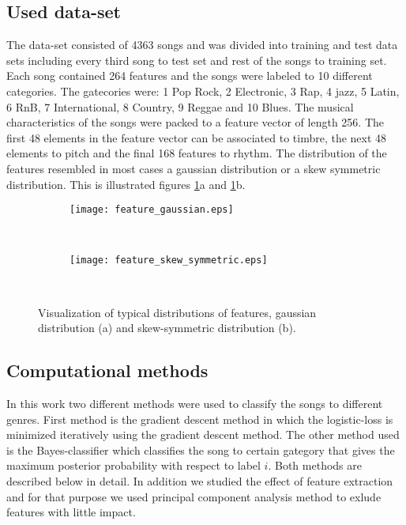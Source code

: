 \documentclass[aps,prb,10pt,twocolumn,groupedaddress]{revtex4-1}
\begin{document}
\subsection{Used data-set}
\label{sec:used_data_set}
The data-set consisted of 4363 songs and was divided into training and test data
sets including every third song to test set and rest of the songs to training
set. Each song contained 264 features and the songs were labeled to 10
different categories. The gatecories were: 1 Pop Rock, 2 Electronic, 3 Rap,
4 jazz, 5 Latin, 6 RnB, 7 International, 8 Country, 9 Reggae and 10 Blues.
The musical characteristics of the songs were packed to a feature
vector of length 256. The first 48 elements in the feature vector can be
associated to timbre, the next 48 elements to pitch and the final 168 features
to rhythm. The distribution of the features resembled in most cases a gaussian
distribution or a skew symmetric distribution. This is illustrated figures
\ref{fig:feature_distribution}a and \ref{fig:feature_distribution}b.
\begin{figure}[!t]
  \centering
  \begin{subfigure}[]{0.38\textwidth}
    \centering
    \texttt{[image: feature\_gaussian.eps]}
    \caption{}
  \end{subfigure}\\
  \centering
  \begin{subfigure}[]{0.38\textwidth}
    \centering
    \texttt{[image: feature\_skew\_symmetric.eps]}
    \caption{}
  \end{subfigure}\\
  \caption{Visualization of typical distributions of features, gaussian distribution (a) and skew-symmetric distribution (b).}
  \label{fig:feature_distribution}
\end{figure}

\subsection{Computational methods}
\label{sec:computational_methods}
In this work two different methods were used to classify the songs to different
genres. First method is the gradient descent method in which the logistic-loss
is minimized iteratively using the gradient descent method.
The other method used is the Bayes-classifier which classifies the song to
certain gategory that gives the maximum posterior probability with respect to
label $i$. Both methods are described below in detail. In addition we studied
the effect of feature extraction and for that purpose we used principal
component analysis method to exlude features with little impact. 
\end{document}
